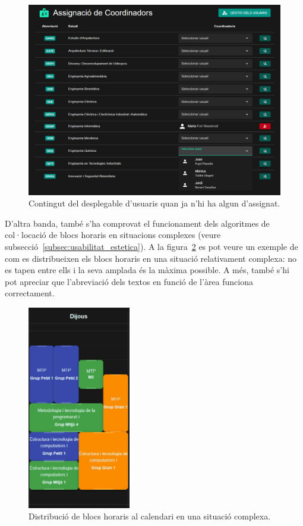 \documentclass[a4paper,12pt]{ThesisStyle}
\begin{document}
\begin{figure}[H]
  \centering
  \includegraphics[width=\textwidth]{assets/proves/assignUser.png}
  \caption{\label{img:assignUser} Contingut del desplegable d'usuaris quan ja n'hi ha algun d'assignat.}
\end{figure}

\newpage

D'altra banda, també s'ha comprovat el funcionament dels algoritmes de col·locació de blocs horaris en situacions complexes (veure subsecció~\ref{subsec:usabilitat_estetica}). A la figura~\ref{img:proves_layout} es pot veure un exemple de com es distribueixen els blocs horaris en una situació relativament complexa: no es tapen entre ells i la seva amplada és la màxima possible. A més, també s'hi pot apreciar que l'abreviació dels textos en funció de l'àrea funciona correctament.

\begin{figure}[H]
  \centering
  \includegraphics[width=0.4\textwidth]{assets/proves/layout.png}
  \caption{\label{img:proves_layout} Distribució de blocs horaris al calendari en una situació complexa.}
\end{figure}
\end{document}
